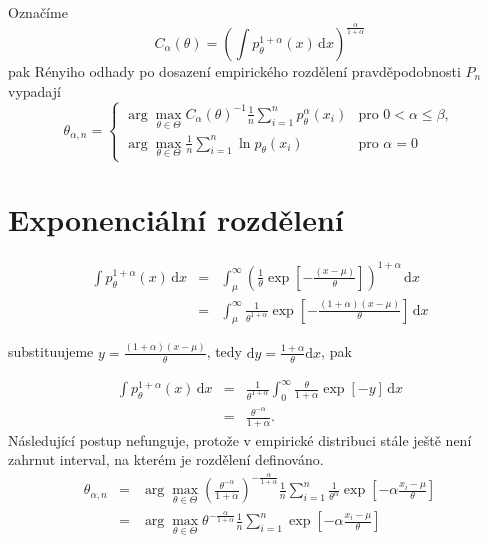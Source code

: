 \documentclass[11pt, a4paper]{article}
\newcommand{\intpa}{\int p_\theta^{1+\alpha}(x) \, \mathrm{d}x }
\newcommand{\fn}{\frac{1}{n} \sum_{i=1}^n p_{\theta}^{\alpha}\left( x_i \right)}
\newcommand{\fln}{\frac{1}{n} \sum_{i=1}^n \ln p_{\theta}\left( x_i \right)}
\newcommand{\Cat}{C_\alpha\left( \theta \right)}
\newcommand{\amtiT}{\arg \max_{\theta \in \Theta}}
\begin{document}
Označíme
\begin{equation}
	\Cat = \left( \intpa \right)^{\frac{\alpha}{1+\alpha}}
\end{equation}
pak Rényiho odhady po dosazení empirického rozdělení pravděpodobnosti $ P_n $ vypadají
\begin{equation}
	\theta_{\alpha,n} = 
	\begin{cases}
		\displaystyle{ \amtiT \Cat^{-1} \fn } & \text{pro } 0 < \alpha \leq \beta, \\
		\displaystyle{ \amtiT  \fln } & \text{pro } \alpha = 0
	\end{cases}	
\end{equation}



\section{Exponenciální rozdělení} %

\begin{eqnarray}
\intpa & = & \int_{\mu }^{\infty } \left( {\frac{1}{\theta} \exp{ \left[ -\frac{(x -\mu )}{\theta } \right] }} \right) ^{1 + \alpha} \, \mathrm{d}x \nonumber\\
 & = & \int_{\mu }^{\infty } {\frac{1}{\theta^{ 1 + \alpha}} \exp{ \left[ -\frac{(1 + \alpha )(x -\mu )}{\theta } \right] }} \, \mathrm{d}x \nonumber
\end{eqnarray} 

substituujeme $ y = \frac{(1+\alpha)(x-\mu)}{\theta} $, tedy $\mathrm{d}y = \frac{1+\alpha}{\theta}\mathrm{d}x $, pak

\begin{eqnarray}
\intpa & = & \frac{1}{\theta^{ 1 + \alpha}} \int_{0}^{\infty } {\frac{\theta}{1+\alpha} \exp{ \left[ -y \right] }} \, \mathrm{d}x \nonumber\\
& = & \frac{\theta ^{-\alpha }}{1+\alpha }.
\end{eqnarray}
Následující postup nefunguje, protože v empirické distribuci stále ještě není zahrnut interval, na kterém je rozdělení definováno.
\begin{eqnarray}
	\theta_{\alpha,n} &= &\amtiT \left( \frac{\theta ^{-\alpha }}{1+\alpha } \right)^{-\frac{\alpha}{1+\alpha}} \frac{1}{n} \sum_{i=1}^n \frac{1}{\theta^\alpha} \exp \left[-\alpha\frac{x_i-\mu}{\theta} \right] \nonumber\\
	&=&\amtiT \theta^{-\frac{\alpha}{1+\alpha}} \frac{1}{n}\sum_{i=1}^n \exp \left[-\alpha\frac{x_i-\mu}{\theta} \right]
\end{eqnarray}
\end{document}
